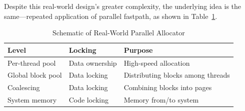 Despite this real-world design's greater complexity, the underlying
idea is the same---repeated application of parallel fastpath,
as shown in
Table~\ref{fig:app:questions:Schematic of Real-World Parallel Allocator}.

\begin{table}
\small
\centering
\renewcommand*{\arraystretch}{1.25}
\begin{tabularx}{\twocolumnwidth}{ll>{\raggedright\arraybackslash}X}
\toprule
Level	& Locking & Purpose \\
\midrule
Per-thread pool	  & Data ownership & High-speed allocation \\
Global block pool & Data locking   & Distributing blocks among threads \\
Coalescing	  & Data locking   & Combining blocks into pages \\
System memory	  & Code locking   & Memory from/to system \\
\bottomrule
\end{tabularx}
\caption{Schematic of Real-World Parallel Allocator}
\label{fig:app:questions:Schematic of Real-World Parallel Allocator}
\end{table}



